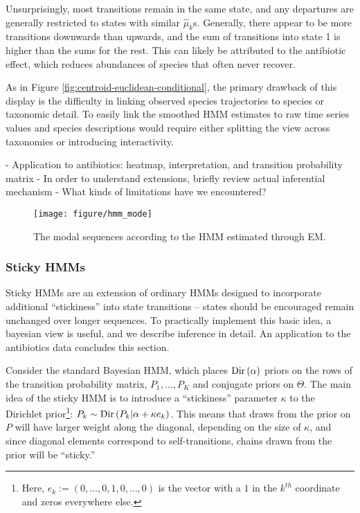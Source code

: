 \documentclass{article}
\begin{document}
Unsurprisingly, most transitions remain in the same state, and any departures
are generally restricted to states with similar $\hat{\mu}_{k}$s. Generally,
there appear to be more transitions downwards than upwards, and the sum of
transitions into state 1 is higher than the sums for the rest. This can likely
be attributed to the antibiotic effect, which reduces abundances of species that
often never recover.

As in Figure \ref{fig:centroid-euclidean-conditional}, the primary drawback of
this display is the difficulty in linking observed species trajectories to
species or taxonomic detail. To easily link the smoothed HMM estimates to raw
time series values and species descriptions would require either splitting the
view across taxonomies or introducing interactivity.

- Application to antibiotics: heatmap, interpretation, and transition
probability matrix
- In order to understand extensions, briefly review actual inferential mechanism
- What kinds of limitations have we encountered?

\begin{figure}[ht]
  \centering
  \texttt{[image: figure/hmm\_mode]}
  \caption{The modal sequences according to the HMM estimated through
    EM. \label{fig:hmm_mode} }
\end{figure}

\subsubsection{Sticky HMMs}
\label{sec:sticky_hmms}

Sticky HMMs are an extension of ordinary HMMs designed to incorporate
additional ``stickiness'' into state transitions -- states should be encouraged
remain unchanged over longer sequences. To practically implement this basic
idea, a bayesian view is useful, and we describe inference in detail. An
application to the antibiotics data concludes this section.

Consider the standard Bayesian HMM, which places $\textnormal{Dir}\left(\alpha\right)$
priors on the rows of the transition probability matrix, $P_{1}, \dots, P_{K}$
and conjugate priors on $\Theta$. The main idea of the sticky HMM is to
introduce a ``stickiness'' parameter $\kappa$ to the Dirichlet
prior\footnote{Here, $e_{k} := \left(0, \dots, 0, 1, 0, \dots, 0\right)$ is the
  vector with a $1$ in the $k^{th}$ coordinate and zeros everywhere else.}:
$P_{k} \sim \textnormal{Dir}\left(P_{k} \vert \alpha + \kappa e_{k}\right)$. This means that
draws from the prior on $P$ will have larger weight along the diagonal,
depending on the size of $\kappa$, and since diagonal elements correspond to
self-transitions, chains drawn from the prior will be ``sticky.''
\end{document}
